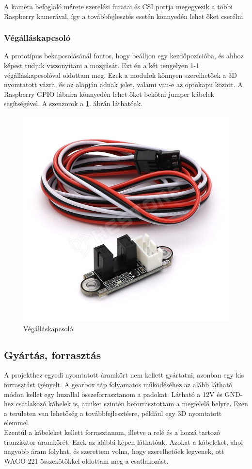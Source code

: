 \documentclass[12pt,a4paper]{article}
\begin{document}
A kamera befoglaló mérete szerelési furatai és CSI portja megegyezik a többi Raspberry kamerával, így a továbbfejlesztés esetén könnyedén lehet őket cserélni.

\subsubsection*{Végálláskapcsoló}
A prototípus bekapcsolásánál fontos, hogy beálljon egy kezdőpozícióba, és ahhoz képest tudjuk viszonyítani a mozgását. Ezt én a két tengelyen 1-1 végálláskapcsolóval oldottam meg. Ezek a modulok könnyen szerelhetőek a 3D nyomtatott vázra, és az alapján adnak jelet, valami van-e az optokapu között. A Raspberry GPIO lábaira könnyedén lehet őket bekötni jumper kábelek segítségével. A szenzorok a \ref{fig:elek_vegallaskapcsolo}. ábrán láthatóak.

\begin{figure}[h!]
	\centering
	\includegraphics[width=0.5\linewidth]{elek_vegallaskapcsolo}
	\caption{Végálláskapcsoló}
	\label{fig:elek_vegallaskapcsolo}
\end{figure}

\subsection{Gyártás, forrasztás}
A projekthez egyedi nyomtatott áramkört nem kellett gyártatni, azonban egy kis forrasztást igényelt. A gearbox táp folyamatos működéséhez az alább látható módon kellet egy huzallal összeforrasztanom a padokat. Látható a 12V és GND-hez csatlakozó kábelek is, amiket szintén beforrasztottam a megfelelő helyre. Ezen a területen van lehetőség a továbbfejlesztésre, például egy 3D nyomtatott elemmel.\\

Ezentúl a kábeleket kellett forrasztanom, illetve a relé és a hozzá tartozó tranzisztor áramkörét. Ezek az alábbi képen láthatóak. Azokat a kábeleket, ahol nagyobb áram folyhat, és szerettem volna, hogy szerelhetőek legyenek, ott WAGO 221 összekötőkkel oldottam meg a csatlakozást.
\end{document}
